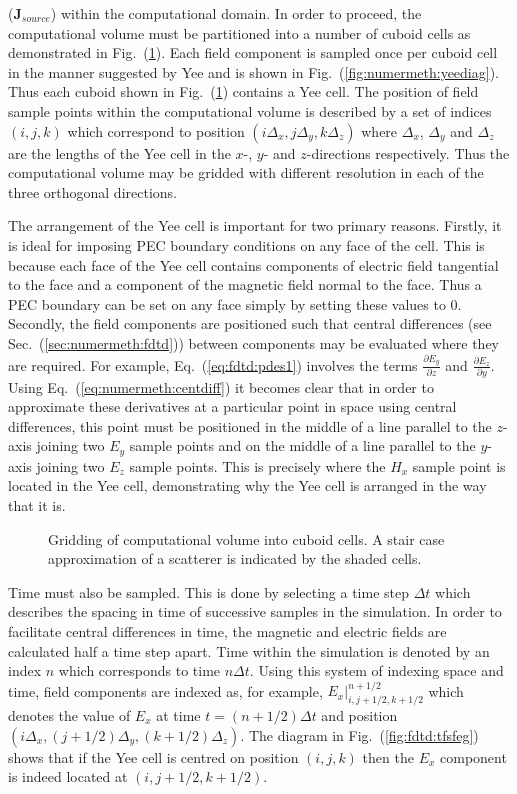\documentclass[a4paper, 12pt]{article}
\newcommand{\eq}[1]{Eq.\ (\ref{#1})}
\newcommand{\rfig}[1]{Fig.\ (\ref{#1})}
\newcommand{\sect}[1]{Sec.\ (\ref{#1})}
\begin{document}
	($\mathbf{J}_{source}$) within the
	computational domain. In order
	to proceed, the computational volume must be partitioned into a number
	of cuboid cells as demonstrated in \rfig{fig:fdtd:fdtdgrid}. Each
	field component is sampled once per cuboid cell in the manner
	suggested by Yee \cite{yee66ieeetransantprop302} and is shown in \rfig{fig:numermeth:yeediag}. Thus each cuboid
	shown in \rfig{fig:fdtd:fdtdgrid} contains a Yee cell. The position of field
	sample points within the computational volume is described by a set of
	indices $(i,j,k)$ which correspond to position
	$(i\Delta_x,j\Delta_y,k\Delta_z)$ where $\Delta_x$, $\Delta_y$ and
	$\Delta_z$ are the lengths of the Yee cell in the $x$-, $y$- and $z$-directions respectively. Thus the computational volume may be gridded
	with different resolution in each of the three orthogonal directions.


	The arrangement of the Yee cell is important for two primary reasons. Firstly, it is ideal for imposing PEC boundary conditions
	on any face of the cell. This is because each face of the Yee cell
	contains components of electric field tangential to the face and a
	component of the magnetic field normal to the face. Thus a PEC
	boundary can be set on any face simply by setting these values to 0. Secondly, the
	field components are positioned such that central differences (see
	\sect{sec:numermeth:fdtd}) between
	components may be evaluated where they are required. For example,
	\eq{eq:fdtd:pdes1} involves the terms $\frac{\partial E_y}{\partial
		z}$ and $\frac{\partial E_z}{\partial y}$. Using
	\eq{eq:numermeth:centdiff} it becomes clear that in order to
	approximate these derivatives at a particular point in space using
	central differences, this
	point must be positioned in the middle of a line parallel to the
	$z$-axis joining two $E_y$ sample points and on the middle of a line
	parallel to the $y$-axis joining two $E_z$ sample points. This is
	precisely where the $H_x$ sample point is located in the Yee cell,
	demonstrating why the Yee cell is arranged in the way that it is.
	\begin{figure}[!h]
		\centering
		\caption{Gridding of computational volume into cuboid cells. A stair
			case approximation of a scatterer is indicated by the shaded cells.}
		\label{fig:fdtd:fdtdgrid}
	\end{figure}

	Time must also be sampled. This is done by selecting a time step
	$\Delta t$ which describes the spacing in time of successive samples in
	the simulation. In order to facilitate central differences in time,
	the magnetic and electric fields are calculated half a time step
	apart. Time within the simulation is denoted by an index $n$ which
	corresponds to time $n\Delta t$. Using this system of indexing space
	and time, field components are indexed as, for example,
	$E_x|^{n+1/2}_{i,j+1/2,k+1/2}$ which denotes the value of $E_x$ at
	time $t=(n+1/2)\Delta t$ and position $(i\Delta_x,(j+1/2)\Delta_y,
	(k+1/2)\Delta_z)$. The diagram in \rfig{fig:fdtd:tfsfeg} shows that
	if the Yee cell is centred on position $(i,j,k)$ then the $E_x$
	component is indeed located at $(i,j+1/2,k+1/2)$.
\end{document}
